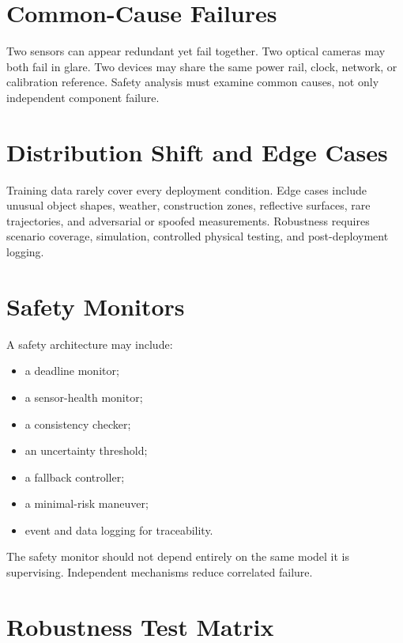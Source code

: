 \section{Common-Cause Failures}

Two sensors can appear redundant yet fail together. Two optical cameras may both fail in glare. Two devices may share the same power rail, clock, network, or calibration reference. Safety analysis must examine common causes, not only independent component failure.

\section{Distribution Shift and Edge Cases}

Training data rarely cover every deployment condition. Edge cases include unusual object shapes, weather, construction zones, reflective surfaces, rare trajectories, and adversarial or spoofed measurements. Robustness requires scenario coverage, simulation, controlled physical testing, and post-deployment logging.

\section{Safety Monitors}

A safety architecture may include:

\begin{itemize}
    \item a deadline monitor;
    \item a sensor-health monitor;
    \item a consistency checker;
    \item an uncertainty threshold;
    \item a fallback controller;
    \item a minimal-risk maneuver;
    \item event and data logging for traceability.
\end{itemize}

The safety monitor should not depend entirely on the same model it is supervising. Independent mechanisms reduce correlated failure.

\section{Robustness Test Matrix}

